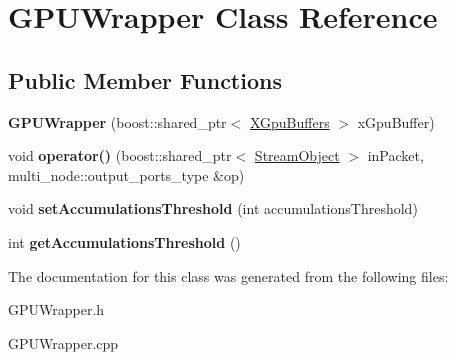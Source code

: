 \hypertarget{class_g_p_u_wrapper}{}\section{G\+P\+U\+Wrapper Class Reference}
\label{class_g_p_u_wrapper}
\subsection*{Public Member Functions}
\begin{DoxyCompactItemize}
\item 
{\bfseries G\+P\+U\+Wrapper} (boost\+::shared\+\_\+ptr$<$ \hyperlink{class_x_gpu_buffers}{X\+Gpu\+Buffers} $>$ x\+Gpu\+Buffer)\hypertarget{class_g_p_u_wrapper_aecf3674fcdd3c17654fc4819735ae3fb}{}\label{class_g_p_u_wrapper_aecf3674fcdd3c17654fc4819735ae3fb}

\item 
void {\bfseries operator()} (boost\+::shared\+\_\+ptr$<$ \hyperlink{class_stream_object}{Stream\+Object} $>$ in\+Packet, multi\+\_\+node\+::output\+\_\+ports\+\_\+type \&op)\hypertarget{class_g_p_u_wrapper_a525bd3c0a01d9c9206cc9f3c00f65f7f}{}\label{class_g_p_u_wrapper_a525bd3c0a01d9c9206cc9f3c00f65f7f}

\item 
void {\bfseries set\+Accumulations\+Threshold} (int accumulations\+Threshold)\hypertarget{class_g_p_u_wrapper_aefe5a323789048a2f92794e39f4baa3d}{}\label{class_g_p_u_wrapper_aefe5a323789048a2f92794e39f4baa3d}

\item 
int {\bfseries get\+Accumulations\+Threshold} ()\hypertarget{class_g_p_u_wrapper_a4914df0ef90d2349a6a3bbc6b4bfe5ca}{}\label{class_g_p_u_wrapper_a4914df0ef90d2349a6a3bbc6b4bfe5ca}

\end{DoxyCompactItemize}


The documentation for this class was generated from the following files\+:\begin{DoxyCompactItemize}
\item 
G\+P\+U\+Wrapper.\+h\item 
G\+P\+U\+Wrapper.\+cpp\end{DoxyCompactItemize}
